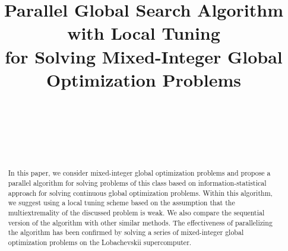 \documentclass[
11pt,%
tightenlines,%
twoside,%
onecolumn,%
nofloats,%
nobibnotes,%
nofootinbib,%
superscriptaddress,%
noshowpacs,%
centertags]%
{revtex4}
\begin{document}

\title{Parallel Global Search Algorithm with Local Tuning\\
for Solving Mixed-Integer Global Optimization Problems}

\author{~}

\author{~}
 

\author{~}
 







\begin{abstract} %
In this paper, we consider mixed-integer global optimization
problems and propose a parallel algorithm for solving problems of
this class based on information-statistical approach for solving
continuous global optimization problems. Within this algorithm, we
suggest using a local tuning scheme based on the assumption that the
multiextremality of the discussed problem is weak. We also compare
the sequential version of the algorithm with other similar methods.
The effectiveness of parallelizing the algorithm has been confirmed
by solving a series of mixed-integer global optimization problems on
the Lobachevskii supercomputer.
\end{abstract}

\end{document}
